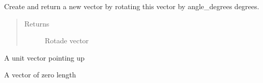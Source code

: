 \documentclass[letterpaper,10pt,english]{sphinxmanual}
\begin{document}
\begin{fulllineitems}
\begin{fulllineitems}
\begin{quote}
\begin{description}
\end{description}\end{quote}

\end{fulllineitems}


\begin{fulllineitems}
\label{geometry:serge.simplevecs.Vec2d.rotated_degrees}
Create and return a new vector by rotating this vector by 
angle\_degrees degrees.
\begin{quote}\begin{description}
\item[{Returns}] \leavevmode
Rotade vector

\end{description}\end{quote}

\end{fulllineitems}


\begin{fulllineitems}
\label{geometry:serge.simplevecs.Vec2d.unit}
A unit vector pointing up

\end{fulllineitems}


\begin{fulllineitems}
\label{geometry:serge.simplevecs.Vec2d.zero}
A vector of zero length

\end{fulllineitems}


\end{fulllineitems}
\end{document}
